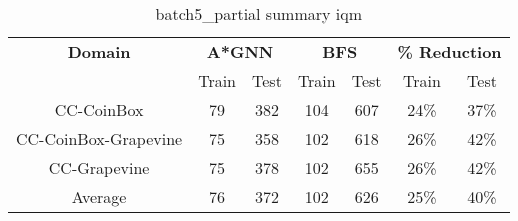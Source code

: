 \begin{table}[!ht]
  \small
  \centering
  \begin{tabular}{c|cc|cc|cc}
    \textbf{Domain}
      & \multicolumn{2}{c|}{\textbf{A*GNN}}
      & \multicolumn{2}{c|}{\textbf{BFS}}
      & \multicolumn{2}{c}{\textbf{\% Reduction}} \\
    \cline{2-7}
    & Train & Test & Train & Test & Train & Test \\
    \hline

    CC-CoinBox & 79 & 382 & 104 & 607 & 24\% & 37\% \\
    CC-CoinBox-Grapevine & 75 & 358 & 102 & 618 & 26\% & 42\% \\
    CC-Grapevine & 75 & 378 & 102 & 655 & 26\% & 42\% \\
    \hline
    Average & 76 & 372 & 102 & 626 & 25\% & 40\% \\

  \end{tabular}
  \caption{batch5_partial summary iqm}
  \label{tab:batch5_partial_res}
\end{table}
